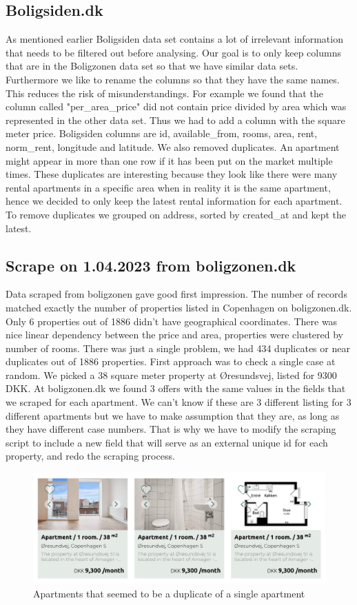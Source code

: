 \documentclass{article}
\begin{document}
\subsection{Boligsiden.dk}
As mentioned earlier Boligsiden data set contains a lot of irrelevant information that needs to be filtered out before analysing. Our goal is to only keep columns that are in the Boligzonen data set so that we have similar data sets. Furthermore we like to rename the columns so that they have the same names. This reduces the risk of misunderstandings. For example we found that the column called "per\_area\_price" did not contain price divided by area which was represented in the other data set. Thus we had to add a column with the square meter price. Boligsiden columns are id, available\_from, rooms, area, rent, norm\_rent, longitude and latitude. We also removed duplicates. An apartment might appear in more than one row if it has been put on the market multiple times. These duplicates are interesting because they look like there were many rental apartments in a specific area when in reality it is the same apartment, hence we decided to only keep the latest rental information for each apartment. To remove duplicates we grouped on address, sorted by created\_at and kept the latest. 

\subsection{Scrape on 1.04.2023 from boligzonen.dk}
Data scraped from boligzonen gave good first impression. The number of records matched exactly the number of properties listed in Copenhagen on boligzonen.dk. Only 6 properties out of 1886 didn't have geographical coordinates. There was nice linear dependency between the price and area, properties were clustered by number of rooms. There was just a single problem, we had 434 duplicates or near duplicates out of 1886 properties. First approach was to check a single case at random. We picked a 38 square meter property at Øresundsvej, listed for 9300 DKK. At boligzonen.dk we found 3 offers with the same values in the fields that we scraped for each apartment. We can't know if these are 3 different listing for 3 different apartments but we have to make assumption that they are, as long as they have different case numbers. That is why we have to modify the scraping script to include a new field that will serve as an external unique id for each property, and redo the scraping process.
\begin{figure}[!htbp]
    \centering
    \includegraphics[scale=0.3]{images/duplicates.png}
    \caption{Apartments that seemed to be a duplicate of a single apartment}
    \label{fig:my_label}
\end{figure}
\end{document}
